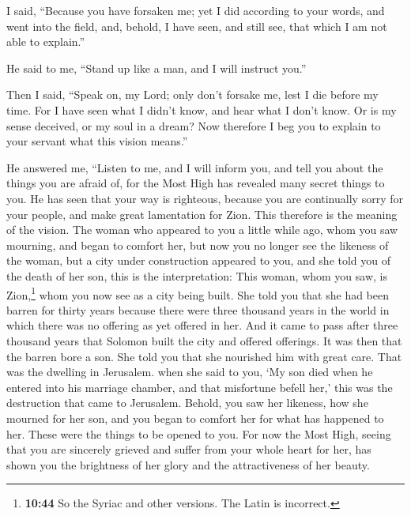  I said, ``Because you have forsaken me; yet I did
according to your words, and went into the field, and, behold, I have
seen, and still see, that which I am not able to explain.''

 He said to me, ``Stand up like a man, and I will
instruct you.''

 Then I said, ``Speak on, my Lord; only don't forsake me,
lest I die before my time.  For I have seen what I didn't
know, and hear what I don't know.  Or is my sense
deceived, or my soul in a dream?  Now therefore I beg you
to explain to your servant what this vision means.''

 He answered me, ``Listen to me, and I will inform you,
and tell you about the things you are afraid of, for the Most High has
revealed many secret things to you.  He has seen that
your way is righteous, because you are continually sorry for your
people, and make great lamentation for Zion.  This
therefore is the meaning of the vision.  The woman who
appeared to you a little while ago, whom you saw mourning, and began to
comfort her,  but now you no longer see the likeness of
the woman, but a city under construction appeared to you,
 and she told you of the death of her son, this is the
interpretation:  This woman, whom you saw, is
Zion,\footnote{\textbf{10:44} So the Syriac and other versions. The
  Latin is incorrect.} whom you now see as a city being built.
 She told you that she had been barren for thirty years
because there were three thousand years in the world in which there was
no offering as yet offered in her.  And it came to pass
after three thousand years that Solomon built the city and offered
offerings. It was then that the barren bore a son.  She
told you that she nourished him with great care. That was the dwelling
in Jerusalem.  when she said to you, `My son died when he
entered into his marriage chamber, and that misfortune befell her,' this
was the destruction that came to Jerusalem.  Behold, you
saw her likeness, how she mourned for her son, and you began to comfort
her for what has happened to her. These were the things to be opened to
you.  For now the Most High, seeing that you are
sincerely grieved and suffer from your whole heart for her, has shown
you the brightness of her glory and the attractiveness of her beauty.
